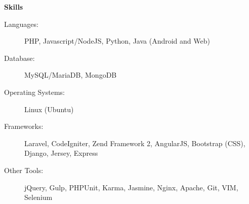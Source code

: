 \documentclass[letterpaper,11pt]{article}
\newcommand{\resheading}[1]{{\large \colorbox{mygrey}{\begin{minipage}{\textwidth}{\textbf{#1 \vphantom{p\^{E}}}}\end{minipage}}}}
\begin{document}
\resheading{Skills}

\begin{description}
\item[Languages:]
PHP, Javascript/NodeJS, Python, Java (Android and Web)
\item[Database:]
MySQL/MariaDB, MongoDB
\item[Operating Systems:]
Linux (Ubuntu)
\item[Frameworks:]
Laravel, CodeIgniter, Zend Framework 2, AngularJS, Bootstrap (CSS), Django, Jersey, Express
\item[Other Tools:]
jQuery, Gulp, PHPUnit, Karma, Jasmine, Nginx, Apache, Git, VIM, Selenium
\end{description}

\pagebreak
\end{document}
